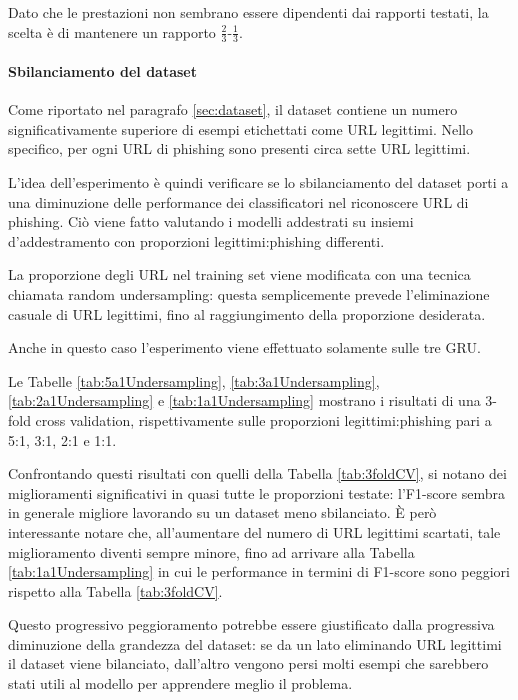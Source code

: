 \documentclass[../../main.tex]{subfiles}
\begin{document}
    Dato che le prestazioni non sembrano essere dipendenti dai rapporti testati, la scelta è di mantenere un rapporto $\frac{2}{3}$-$\frac{1}{3}$.

    \paragraph{Sbilanciamento del dataset}
    Come riportato nel paragrafo \ref{sec:dataset}, il dataset contiene un numero significativamente superiore di esempi etichettati come URL legittimi. Nello specifico, per ogni URL di phishing sono presenti circa sette URL legittimi.

    L'idea dell'esperimento è quindi verificare se lo sbilanciamento del dataset porti a una diminuzione delle performance dei classificatori nel riconoscere URL di phishing. Ciò viene fatto valutando i modelli addestrati su insiemi d'addestramento con proporzioni legittimi:phishing differenti. 
    
    La proporzione degli URL nel training set viene modificata con una tecnica chiamata random undersampling: questa semplicemente prevede l'eliminazione casuale di URL legittimi, fino al raggiungimento della proporzione desiderata. 
    
    Anche in questo caso l'esperimento viene effettuato solamente sulle tre GRU.

    Le Tabelle \ref{tab:5a1Undersampling}, \ref{tab:3a1Undersampling}, \ref{tab:2a1Undersampling} e \ref{tab:1a1Undersampling} mostrano i risultati di una 3-fold cross validation, rispettivamente sulle proporzioni legittimi:phishing pari a 5:1, 3:1, 2:1 e 1:1.

    Confrontando questi risultati con quelli della Tabella \ref{tab:3foldCV}, si notano dei miglioramenti significativi in quasi tutte le proporzioni testate: l'F1-score sembra in generale migliore lavorando su un dataset meno sbilanciato. È però interessante notare che, all'aumentare del numero di URL legittimi scartati, tale miglioramento diventi sempre minore, fino ad arrivare alla Tabella \ref{tab:1a1Undersampling} in cui le performance in termini di F1-score sono peggiori rispetto alla Tabella \ref{tab:3foldCV}.

    Questo progressivo peggioramento potrebbe essere giustificato dalla progressiva diminuzione della grandezza del dataset: se da un lato eliminando URL legittimi il dataset viene bilanciato, dall'altro vengono persi molti esempi che sarebbero stati utili al modello per apprendere meglio il problema.
\end{document}
